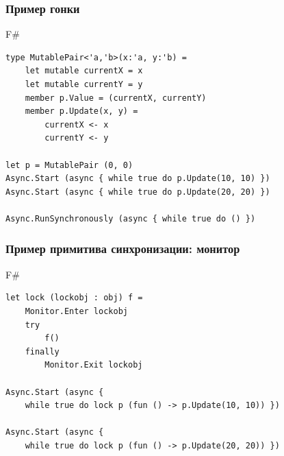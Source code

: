 \documentclass[xetex,mathserif,serif]{beamer}
\begin{document}
    \begin{frame}[fragile]
        \frametitle{Пример гонки}
        \begin{exampleblock}{F\#}
            \begin{lstlisting}
type MutablePair<'a,'b>(x:'a, y:'b) =
    let mutable currentX = x
    let mutable currentY = y
    member p.Value = (currentX, currentY)
    member p.Update(x, y) =
        currentX <- x
        currentY <- y

let p = MutablePair (0, 0)
Async.Start (async { while true do p.Update(10, 10) })
Async.Start (async { while true do p.Update(20, 20) })

Async.RunSynchronously (async { while true do () })
\end{lstlisting}
\end{exampleblock}
\end{frame}

    \begin{frame}[fragile]
        \frametitle{Пример примитива синхронизации: монитор}
        \begin{exampleblock}{F\#}
            \begin{lstlisting}
let lock (lockobj : obj) f =
    Monitor.Enter lockobj
    try
        f()
    finally
        Monitor.Exit lockobj

Async.Start (async { 
    while true do lock p (fun () -> p.Update(10, 10)) })

Async.Start (async { 
    while true do lock p (fun () -> p.Update(20, 20)) })
\end{lstlisting}
\end{exampleblock}
\end{frame}
\end{document}
